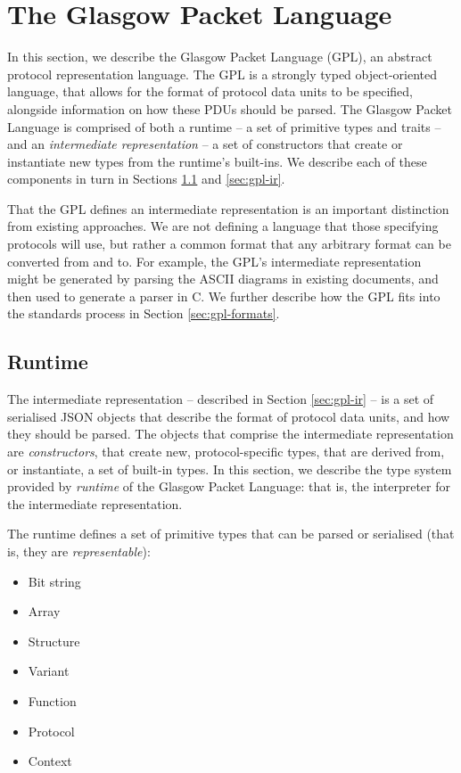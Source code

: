 \documentclass[10pt,sigconf]{acmart}
\begin{document}
\section{The Glasgow Packet Language}
\label{sec:gpl}

In this section, we describe the Glasgow Packet Language (GPL), an abstract protocol
representation language. The GPL is a strongly typed object-oriented language, that allows
for the format of protocol data units to be specified, alongside information on how these
PDUs should be parsed. The Glasgow Packet Language is comprised of both a runtime -- a set
of primitive types and traits -- and an \emph{intermediate representation} -- a set of
constructors that create or instantiate new types from the runtime's built-ins. We
describe each of these components in turn in Sections \ref{sec:gpl-runtime} and
\ref{sec:gpl-ir}.

That the GPL defines an intermediate representation is an important distinction from
existing approaches. We are not defining a language that those specifying protocols will
use, but rather a common format that any arbitrary format can be converted from and to.
For example, the GPL's intermediate representation might be generated by parsing the ASCII
diagrams in existing documents, and then used to generate a parser in C. We further
describe how the GPL fits into the standards process in Section \ref{sec:gpl-formats}.

\subsection{Runtime}
\label{sec:gpl-runtime}

The intermediate representation -- described in Section \ref{sec:gpl-ir} -- is a set of
serialised JSON objects that describe the format of protocol data units, and how they
should be parsed. The objects that comprise the intermediate representation are
\emph{constructors}, that create new, protocol-specific types, that are derived from, or
instantiate, a set of built-in types. In this section, we describe the type system
provided by \emph{runtime} of the Glasgow Packet Language: that is, the interpreter for
the intermediate representation.

The runtime defines a set of primitive types that can be parsed or serialised (that is,
they are \emph{representable}):
\begin{itemize}
	\item Bit string
	\item Array
	\item Structure 
	\item Variant
	\item Function
	\item Protocol
	\item Context
\end{itemize}
\end{document}
